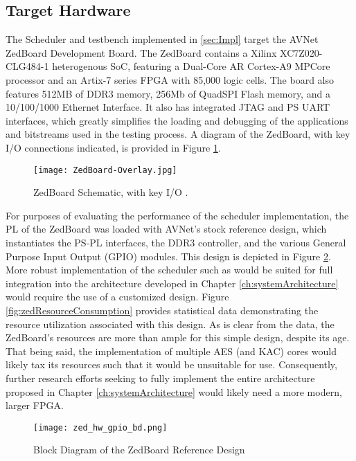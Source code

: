 \subsection{Target Hardware}\label{subsec:targetHW}
The Scheduler and testbench implemented in \ref{sec:Impl} target the AVNet ZedBoard Development Board. The ZedBoard contains a Xilinx XC7Z020-CLG484-1 heterogenous SoC, featuring a Dual-Core AR Cortex-A9 MPCore processor and an Artix-7 series FPGA with 85,000 logic cells. The board also features 512MB of DDR3 memory, 256Mb of QuadSPI Flash memory, and a 10/100/1000 Ethernet Interface. It also has integrated JTAG and PS UART interfaces, which greatly simplifies the loading and debugging of the applications and bitstreams used in the testing process. A diagram of the ZedBoard, with key I/O connections indicated, is provided in Figure \ref{fig:zedImg}.

\begin{figure}[ht]
    \centering
    \texttt{[image: ZedBoard-Overlay.jpg]}
    \caption[ZedBoard Schematic]{ZedBoard Schematic, with key I/O \cite{noauthor_zedboard_nodate}.}
    \label{fig:zedImg}
\end{figure}

For purposes of evaluating the performance of the scheduler implementation, the PL of the ZedBoard was loaded with AVNet's stock reference design, which instantiates the PS-PL interfaces, the DDR3 controller, and the various General Purpose Input Output (GPIO) modules. This design is depicted in Figure \ref{fig:zedGPIODesign}. More robust implementation of the scheduler such as would be suited for full integration into the architecture developed in Chapter \ref{ch:systemArchitecture} would require the use of a customized design. Figure \ref{fig:zedResourceConsumption} provides statistical data demonstrating the resource utilization associated with this design. As is clear from the data, the ZedBoard's resources are more than ample for this simple design, despite its age. That being said, the implementation of multiple AES (and KAC) cores would likely tax its resources such that it would be unsuitable for use. Consequently, further research efforts seeking to fully implement the entire architecture proposed in Chapter \ref{ch:systemArchitecture} would likely need a more modern, larger FPGA.

\begin{figure}
    \centering
    \texttt{[image: zed\_hw\_gpio\_bd.png]}
    \caption[ZedBoard Reference Design]{Block Diagram of the ZedBoard Reference Design}
    \label{fig:zedGPIODesign}
\end{figure}


